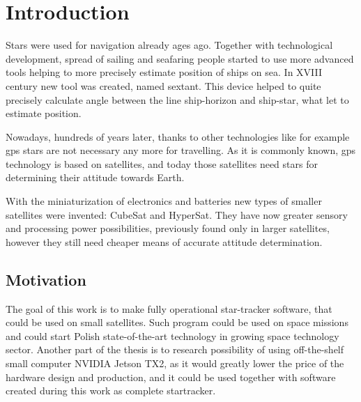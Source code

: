 \documentclass[12pt,a4paper,oneside]{article}
\begin{document}
\newpage
\setlength{\parindent}{1cm}
\setlength{\parskip}{\baselineskip}%



\glsaddall
\setlength{\glsdescwidth}{0.5\linewidth}
\setlength{\glspagelistwidth}{0.1\linewidth}

\printnoidxglossary[type=acronym,sort=letter]
\newpage

\printnoidxglossary[type=symbols,sort=use]

\newpage


\section{Introduction}
Stars were used for navigation already ages ago. Together with technological development, spread of sailing and seafaring people started to use more advanced tools helping to more precisely estimate position of ships on sea. In XVIII century new tool was created, named sextant. This device helped to quite precisely calculate angle between the line ship-horizon and ship-star, what let to estimate position.

Nowadays, hundreds of years later, thanks to other technologies like for example \gls{gps} stars are not necessary any more for travelling. As it is commonly known, \gls{gps} technology is based on satellites, and today those satellites need stars for determining their attitude towards Earth.

With the miniaturization of electronics and batteries new types of smaller satellites were invented: CubeSat and HyperSat. They have now greater sensory and processing power possibilities, previously found only in larger satellites, however they still need cheaper means of accurate attitude determination.

\subsection{Motivation}
The goal of this work is to make fully operational star-tracker software, that could be used on small satellites. Such program could be used on space missions and could start Polish state-of-the-art technology in growing space technology sector.
Another part of the thesis is to research possibility of using off-the-shelf small computer NVIDIA Jetson TX2, as it would greatly lower the price of the hardware design and production, and it could be used together with software created during this work as complete startracker.

\newpage
\end{document}
